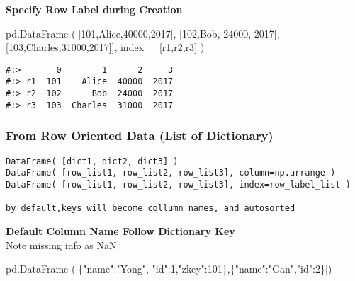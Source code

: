 \documentclass[
]{book}
\newenvironment{Shaded}{\begin{snugshade}}{\end{snugshade}}
\newcommand{\DecValTok}[1]{\textcolor[rgb]{0.06,0.06,0.06}{#1}}
\newcommand{\NormalTok}[1]{#1}
\newcommand{\OperatorTok}[1]{\textcolor[rgb]{0.43,0.43,0.43}{\textbf{#1}}}
\newcommand{\StringTok}[1]{\textcolor[rgb]{0.5,0.5,0.5}{#1}}
\begin{document}
\textbf{Specify Row Label during Creation}

\begin{Shaded}
\begin{Highlighting}[]
\NormalTok{pd.DataFrame ([[}\DecValTok{101}\NormalTok{,}\StringTok{\textquotesingle{}Alice\textquotesingle{}}\NormalTok{,}\DecValTok{40000}\NormalTok{,}\DecValTok{2017}\NormalTok{],}
\NormalTok{               [}\DecValTok{102}\NormalTok{,}\StringTok{\textquotesingle{}Bob\textquotesingle{}}\NormalTok{,  }\DecValTok{24000}\NormalTok{, }\DecValTok{2017}\NormalTok{], }
\NormalTok{               [}\DecValTok{103}\NormalTok{,}\StringTok{\textquotesingle{}Charles\textquotesingle{}}\NormalTok{,}\DecValTok{31000}\NormalTok{,}\DecValTok{2017}\NormalTok{]], index   }\OperatorTok{=}\NormalTok{ [}\StringTok{\textquotesingle{}r1\textquotesingle{}}\NormalTok{,}\StringTok{\textquotesingle{}r2\textquotesingle{}}\NormalTok{,}\StringTok{\textquotesingle{}r3\textquotesingle{}}\NormalTok{] )}
\end{Highlighting}
\end{Shaded}

\begin{verbatim}
#:>       0        1      2     3
#:> r1  101    Alice  40000  2017
#:> r2  102      Bob  24000  2017
#:> r3  103  Charles  31000  2017
\end{verbatim}

\hypertarget{from-row-oriented-data-list-of-dictionary}{%
\subsubsection{From Row Oriented Data (List of Dictionary)}\label{from-row-oriented-data-list-of-dictionary}}

\begin{verbatim}
DataFrame( [dict1, dict2, dict3] )
DataFrame( [row_list1, row_list2, row_list3], column=np.arrange )
DataFrame( [row_list1, row_list2, row_list3], index=row_label_list )

by default,keys will become collumn names, and autosorted
\end{verbatim}

\textbf{Default Column Name Follow Dictionary Key}\\
Note missing info as NaN

\begin{Shaded}
\begin{Highlighting}[]
\NormalTok{pd.DataFrame ([\{}\StringTok{"name"}\NormalTok{:}\StringTok{"Yong"}\NormalTok{, }\StringTok{"id"}\NormalTok{:}\DecValTok{1}\NormalTok{,}\StringTok{"zkey"}\NormalTok{:}\DecValTok{101}\NormalTok{\},\{}\StringTok{"name"}\NormalTok{:}\StringTok{"Gan"}\NormalTok{,}\StringTok{"id"}\NormalTok{:}\DecValTok{2}\NormalTok{\}])}
\end{Highlighting}
\end{Shaded}
\end{document}
